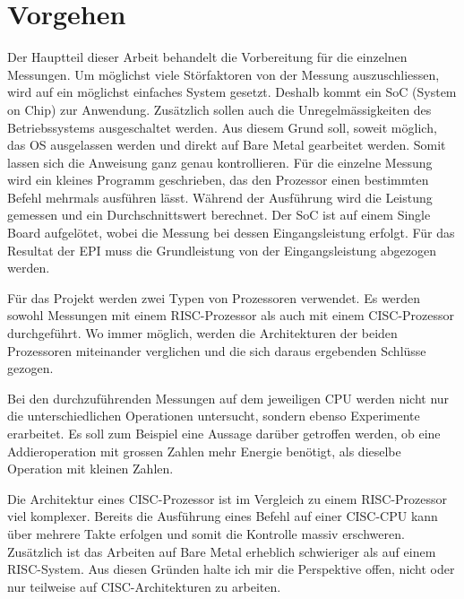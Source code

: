 \section{Vorgehen}

Der Hauptteil dieser Arbeit behandelt die Vorbereitung für die einzelnen Messungen. Um möglichst viele Störfaktoren
von der Messung auszuschliessen, wird auf ein möglichst einfaches System gesetzt. Deshalb kommt ein SoC
(System on Chip) zur Anwendung. Zusätzlich sollen auch die Unregelmässigkeiten des Betriebssystems ausgeschaltet
werden. Aus diesem Grund soll, soweit möglich, das OS ausgelassen werden und direkt auf Bare Metal gearbeitet werden.
Somit lassen sich die Anweisung ganz genau kontrollieren. Für die einzelne Messung wird ein kleines Programm geschrieben,
das den Prozessor einen bestimmten Befehl mehrmals ausführen lässt. Während der Ausführung wird die Leistung gemessen und
ein Durchschnittswert berechnet. Der SoC ist auf einem Single Board aufgelötet, wobei
die Messung bei dessen Eingangsleistung erfolgt. Für das Resultat der EPI muss die Grundleistung von der Eingangsleistung abgezogen
werden.
\par
Für das Projekt werden zwei Typen von Prozessoren verwendet. Es werden sowohl Messungen mit einem RISC-Prozessor
als auch mit einem CISC-Prozessor durchgeführt. Wo immer möglich, werden die Architekturen der beiden Prozessoren miteinander verglichen
und die sich daraus ergebenden Schlüsse gezogen.
\par
Bei den durchzuführenden Messungen auf dem jeweiligen CPU werden nicht nur die unterschiedlichen Operationen untersucht, sondern ebenso 
Experimente erarbeitet. Es soll zum Beispiel eine Aussage darüber getroffen werden, ob eine Addieroperation
mit grossen Zahlen mehr Energie benötigt, als dieselbe Operation mit kleinen Zahlen.
\par
Die Architektur eines CISC-Prozessor ist im Vergleich zu einem RISC-Prozessor viel komplexer. Bereits die Ausführung eines Befehl
auf einer CISC-CPU kann über mehrere Takte erfolgen und somit die Kontrolle massiv erschweren. Zusätzlich ist das Arbeiten auf Bare
Metal erheblich schwieriger als auf einem RISC-System. Aus diesen Gründen halte ich mir die Perspektive offen,
nicht oder nur teilweise auf CISC-Architekturen zu arbeiten. 

